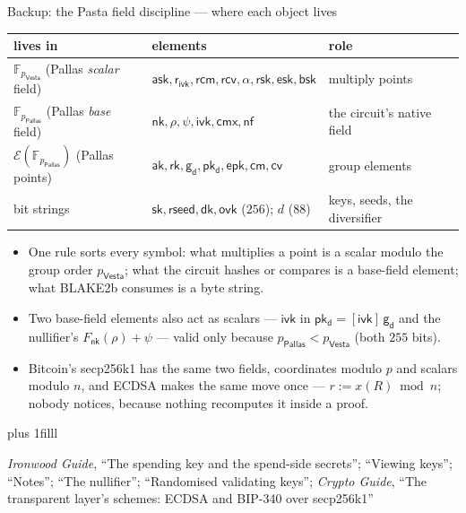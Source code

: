 \documentclass[aspectratio=169,11pt]{beamer}
\newcommand{\F}{\mathbb{F}}
\newcommand{\Ep}{\ensuremath{\mathcal{E}}}
\newcommand{\Pallas}{\ensuremath{\mathsf{Pallas}}}
\newcommand{\Vesta}{\ensuremath{\mathsf{Vesta}}}
\newcommand{\Fpp}{\ensuremath{\F_{p_{\Pallas}}}}
\newcommand{\Fpv}{\ensuremath{\F_{p_{\Vesta}}}}
\newcommand{\nfsym}{\ensuremath{\mathsf{nf}}}
\newcommand{\cmsym}{\ensuremath{\mathsf{cm}}}
\newcommand{\cmx}{\ensuremath{\mathsf{cmx}}}
\newcommand{\cvsym}{\ensuremath{\mathsf{cv}}}
\newcommand{\rksym}{\ensuremath{\mathsf{rk}}}
\newcommand{\gd}{\ensuremath{\mathsf{g_d}}}
\newcommand{\pkd}{\ensuremath{\mathsf{pk_d}}}
\newcommand{\aksym}{\ensuremath{\mathsf{ak}}}
\newcommand{\nksym}{\ensuremath{\mathsf{nk}}}
\newcommand{\asksym}{\ensuremath{\mathsf{ask}}}
\newcommand{\ivk}{\ensuremath{\mathsf{ivk}}}
\newcommand{\ovk}{\ensuremath{\mathsf{ovk}}}
\newcommand{\dk}{\ensuremath{\mathsf{dk}}}
\newcommand{\rcm}{\ensuremath{\mathsf{rcm}}}
\newcommand{\rcv}{\ensuremath{\mathsf{rcv}}}
\newcommand{\rivk}{\ensuremath{\mathsf{r_{ivk}}}}
\newcommand{\rsk}{\ensuremath{\mathsf{rsk}}}
\newcommand{\esk}{\ensuremath{\mathsf{esk}}}
\newcommand{\epk}{\ensuremath{\mathsf{epk}}}
\newcommand{\src}[1]{\par\vskip0pt plus 1filll
  {\fontsize{6}{7.2}\selectfont\color{arbdim}\raggedright #1\par}}
\begin{document}
\begin{frame}{Backup: the Pasta field discipline --- where each object lives}
\begin{center}\small
\begin{tabular}{@{}lll@{}}
\toprule
lives in & elements & role \\
\midrule
\Fpv{} (Pallas \emph{scalar} field) &
  $\asksym, \rivk, \rcm, \rcv, \alpha, \rsk, \esk, \mathsf{bsk}$ &
  multiply points \\
\Fpp{} (Pallas \emph{base} field) &
  $\nksym, \rho, \psi, \ivk, \cmx, \nfsym$ &
  the circuit's native field \\
$\Ep(\Fpp)$ (Pallas points) &
  $\aksym, \rksym, \gd, \pkd, \epk, \cmsym, \cvsym$ &
  group elements \\
bit strings &
  $\mathsf{sk}, \mathsf{rseed}, \dk, \ovk$ ($256$); $d$ ($88$) &
  keys, seeds, the diversifier \\
\bottomrule
\end{tabular}
\end{center}
\begin{itemize}\small
  \item One rule sorts every symbol: what multiplies a point is a scalar
    modulo the group order $p_{\Vesta}$; what the circuit hashes or
    compares is a base-field element; what BLAKE2b consumes is a byte
    string.
  \item Two base-field elements also act as scalars --- $\ivk$ in $\pkd =
    [\ivk]\,\gd$ and the nullifier's $F_{\nksym}(\rho) + \psi$ --- valid
    only because $p_{\Pallas} < p_{\Vesta}$ (both $255$ bits).
  \item Bitcoin's secp256k1 has the same two fields, coordinates modulo
    $p$ and scalars modulo $n$, and ECDSA makes the same move once ---
    $r := x(R) \bmod n$; nobody notices, because nothing recomputes it
    inside a proof.
\end{itemize}
\src{\emph{Ironwood Guide}, ``The spending key and the spend-side secrets'';
``Viewing keys''; ``Notes''; ``The nullifier''; ``Randomised validating keys'';
\emph{Crypto Guide}, ``The transparent layer's schemes: ECDSA and BIP-340 over
secp256k1''}
\end{frame}
\end{document}
